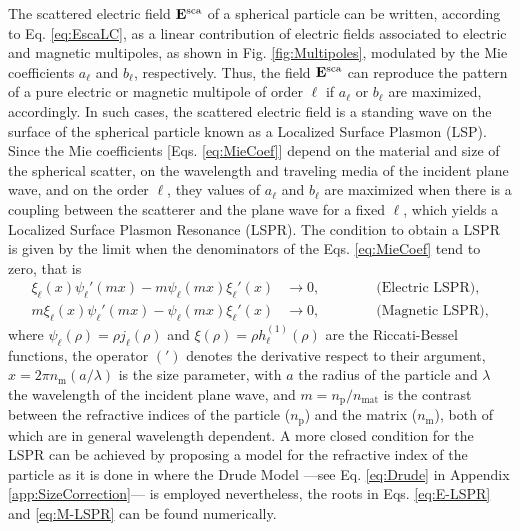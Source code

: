 The scattered electric field $\vb{E}^\text{sca}$ of a spherical particle can be written, according to Eq. \eqref{eq:EscaLC}, as a linear contribution of electric fields associated to electric and magnetic multipoles, as shown in Fig. \ref{fig:Multipoles}, modulated by the Mie coefficients $a_\ell$ and $b_\ell$, respectively. Thus, the field $\vb{E}^\text{sca}$ can reproduce the pattern of a pure  electric or magnetic multipole of order $\ell$ if $a_\ell$ or $b_\ell$ are maximized, accordingly. In such cases, the scattered electric field is a standing wave on the surface of the spherical particle known as a Localized Surface Plasmon (LSP). Since the Mie coefficients [Eqs. \eqref{eq:MieCoef}]  depend on the material and size of the spherical scatter, on the wavelength and traveling media of the incident plane wave, and on  the order $\ell$, they values of $a_\ell$ and $b_\ell$ are maximized when there is a coupling between the scatterer and the plane wave for a fixed $\ell$, which yields a Localized Surface Plasmon Resonance (LSPR). The condition to obtain a LSPR is given by the limit when the denominators of the Eqs. \eqref{eq:MieCoef} tend to zero, that is
%
\begin{align}
 	\xi_\ell(x)\psi_\ell'(mx)-m\psi_\ell(mx)\xi_\ell'(x) &\to 0, \qquad\qquad \text{(Electric LSPR),}
 		\label{eq:E-LSPR}\\
 	m\xi_\ell(x)\psi_\ell'(mx)-\psi_\ell(mx)\xi_\ell'(x) &\to 0, \qquad\qquad \text{(Magnetic LSPR),}
 		\label{eq:M-LSPR}
\end{align}
%
where $\psi_\ell( \rho) = \rho j_\ell(\rho)$ and $\xi(\rho) = \rho h_\ell^{(1)}(\rho)$  are the Riccati-Bessel functions, the operator $(')$ denotes the derivative respect to their argument,  $x= 2\pi n_\text{m} (a/\lambda)$ is the size parameter, with $a$ the radius of the particle and $\lambda$ the wavelength of the incident plane wave, and $m =  n_\text{p} / n_\text{mat}$ is the contrast between the refractive indices of the particle ($n_\text{p}$) and the matrix ($n_\text{m}$), both of which are in general wavelength dependent. A more closed condition for the  LSPR can be achieved by proposing a model for the refractive index of the particle as it is done in \cite{maciel_escudero_linear_2017} where the Drude Model ---see Eq. \eqref{eq:Drude} in Appendix \ref{app:SizeCorrection}--- is employed nevertheless, the roots in Eqs. \eqref{eq:E-LSPR} and \eqref{eq:M-LSPR} can be found numerically.

